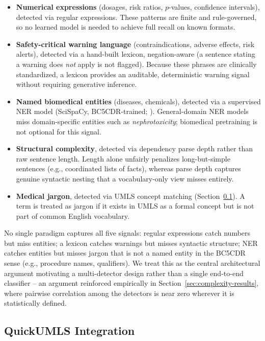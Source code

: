 \documentclass[11pt]{article}
\begin{document}
\begin{itemize}
    \item \textbf{Numerical expressions} (dosages, risk ratios, $p$-values,
    confidence intervals), detected via regular expressions. These patterns are
    finite and rule-governed, so no learned model is needed to achieve full
    recall on known formats.
    \item \textbf{Safety-critical warning language} (contraindications, adverse
    effects, risk alerts), detected via a hand-built lexicon, negation-aware (a
    sentence stating a warning does \emph{not} apply is not flagged). Because
    these phrases are clinically standardized, a lexicon provides an auditable,
    deterministic warning signal without requiring generative inference.
    \item \textbf{Named biomedical entities} (diseases, chemicals), detected via
    a supervised NER model (SciSpaCy, BC5CDR-trained; \citealp{neumann2019scispacy}).
    General-domain NER models miss domain-specific entities such as
    \emph{nephrotoxicity}; biomedical pretraining is not optional for this
    signal.
    \item \textbf{Structural complexity}, detected via dependency parse depth
    rather than raw sentence length. Length alone unfairly penalizes
    long-but-simple sentences (e.g., coordinated lists of facts), whereas parse
    depth captures genuine syntactic nesting that a vocabulary-only view misses
    entirely.
    \item \textbf{Medical jargon}, detected via UMLS concept matching
    (Section~\ref{sec:quickumls}). A term is treated as jargon if it exists in
    UMLS as a formal concept but is not part of common English vocabulary.
\end{itemize}

No single paradigm captures all five signals: regular expressions catch numbers
but miss entities; a lexicon catches warnings but misses syntactic structure; NER
catches entities but misses jargon that is not a named entity in the BC5CDR sense
(e.g., procedure names, qualifiers). We treat this as the central architectural
argument motivating a multi-detector design rather than a single end-to-end
classifier -- an argument reinforced empirically in
Section~\ref{sec:complexity-results}, where pairwise correlation among the
detectors is near zero wherever it is statistically defined.

\subsection{QuickUMLS Integration}
\label{sec:quickumls}
\end{document}
